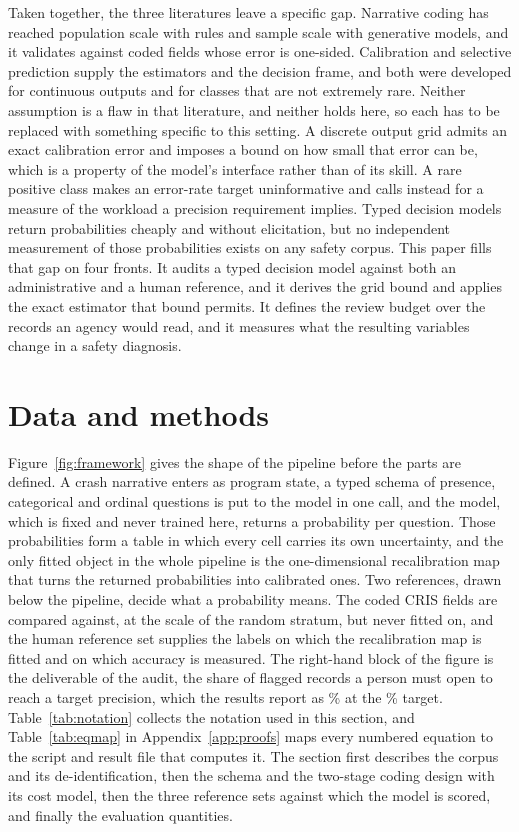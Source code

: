 Taken together, the three literatures leave a specific gap. Narrative coding has reached
population scale with rules and sample scale with generative models, and it validates
against coded fields whose error is one-sided. Calibration and selective prediction supply
the estimators and the decision frame, and both were developed for continuous outputs and for
classes that are not extremely rare. Neither assumption is a flaw in that literature, and
neither holds here, so each has to be replaced with something specific to this setting. A
discrete output grid admits an exact calibration error and imposes a bound on how small that
error can be, which is a property of the model's interface rather than of its skill. A rare
positive class makes an error-rate target uninformative and calls instead for a measure of the
workload a precision requirement implies. Typed decision models return probabilities cheaply
and without elicitation, but no independent measurement of those probabilities exists on any
safety corpus. This paper fills that gap on four fronts. It audits a typed decision model against both an
administrative and a human reference, and it derives the grid bound and applies the exact
estimator that bound permits. It defines the review budget over the records an agency would
read, and it measures what the resulting variables change in a safety diagnosis.

\section{Data and methods}
\label{sec:methods}

Figure~\ref{fig:framework} gives the shape of the pipeline before the parts are defined. A
crash narrative enters as program state, a typed schema of \NPresence{} presence, \NChoice{}
categorical and \NScore{} ordinal questions is put to the model in one call, and the model,
which is fixed and never trained here, returns a probability per question. Those
probabilities form a table in which every cell carries its own uncertainty, and the only
fitted object in the whole pipeline is the one-dimensional recalibration map that turns the
returned probabilities into calibrated ones. Two references, drawn below the pipeline, decide
what a probability means. The coded CRIS fields are compared against, at the scale of the random stratum, but never
fitted on, and the human reference set supplies the labels on which the recalibration map is
fitted and on which accuracy is measured. The right-hand block of the figure is the
deliverable of the audit, the share of flagged records a person must open to reach a target
precision, which the results report as \GoldBudgetNinety\% at the \PrecTargetNinety\% target.
Table~\ref{tab:notation} collects the notation used in this section, and Table~\ref{tab:eqmap}
in Appendix~\ref{app:proofs} maps every numbered equation to the script and result file that
computes it. The section first describes the corpus and its de-identification, then the
schema and the two-stage coding design with its cost model, then the three reference sets
against which the model is scored, and finally the evaluation quantities.

